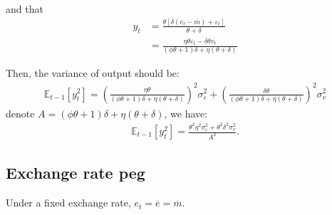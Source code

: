 \documentclass[a4paper,12pt]{article} %
\theoremstyle{nonitalic}
\begin{document}
and that
\begin{align*}
    y_t &= \frac{\theta \left[\delta (e_t - \overline{m}) + \varepsilon_t \right]}{\theta + \delta} \\
        &= \frac{\eta \theta \varepsilon_t - \delta \theta v_t}{(\phi \theta + 1)\delta + \eta (\theta + \delta)} \tag{2.1.4}
\end{align*}

Then, the variance of output should be:
\begin{gather*}
    \mathbb{E}_{t-1}[y_t^2] = \left( \frac{\eta \theta}{(\phi \theta + 1)\delta + \eta (\theta + \delta)}\right)^2 \sigma_{\varepsilon}^2 + \left( \frac{\delta \theta}{(\phi \theta + 1)\delta + \eta (\theta + \delta)} \right)^2 \sigma_v^2
\end{gather*}
denote $A = (\phi \theta + 1)\delta + \eta (\theta + \delta)$, we have:
\begin{gather*}
    \mathbb{E}_{t-1}[y_t^2] = \frac{\theta^2 \eta^2 \sigma_{\varepsilon}^2 + \theta^2 \delta^2 \sigma_v^2}{A^2}.
\end{gather*}

\subsection{Exchange rate peg}

Under a fixed exchange rate, $e_t = \overline{e} = \overline{m} $.
\end{document}
